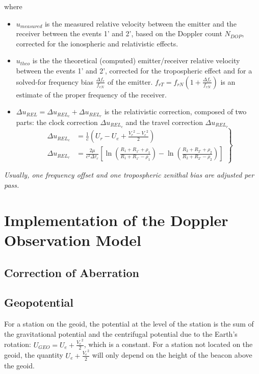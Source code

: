 where 
\begin{itemize}
    \item \(u_{measured}\) is the measured relative velocity between the emitter and 
    the receiver between the events 1' and 2', based on the Doppler count \(N_{DOP}\), 
    corrected for the ionospheric and relativistic effects.

    \item \(u_{theo}\) is the the theoretical (computed) emitter/receiver relative velocity 
    between the events 1' and 2', corrected for the tropospheric effect and for a solved-for 
    frequency bias \(\frac{\Delta f_e}{f_{eN}}\) of the emitter. \(f_{rT} = f_{rN} (1 + \frac{\Delta f_r}{f_{rN}})\) 
    is an estimate of the proper frequency of the receiver.

    \item \(\Delta u_{REL} = \Delta u_{{REL}_c} + \Delta u_{{REL}_r}\) is the relativistic 
    correction, composed of two parts: the clock correction \(\Delta u_{{REL}_c}\) and the 
    travel correction \(\Delta u_{{REL}_r}\)
    \begin{equation}
        \left.\begin{aligned}
            \Delta u_{{REL}_c} & = \frac{1}{c} (U_r - U_e + \frac{{V_r}^2 - {V_e}^2}{2})\\
            \Delta u_{{REL}_r} & = \frac{2 \mu}{c^2 \Delta\tau_r} [\ln{(\frac{R_1 + R_{1'} + \rho_1}{R_1 + R_{1'} - \rho_1})} - \ln{(\frac{R_2 + R_{2'} + \rho_2}{R_2 + R_{2'} - \rho_2})}]
        \end{aligned}
    \right\}
    \end{equation}
\end{itemize}

\emph{Usually, one frequency offset and one tropospheric zenithal bias are adjusted per pass.}

\section{Implementation of the Doppler Observation Model}

\subsection{Correction of Aberration}

\subsection{Geopotential}
For a station on the geoid, the potential at the level of the station is the sum 
of the gravitational potential and the centrifugal potential due to the Earth's 
rotation: \(U_{GEO} = U_e + \frac{{V_e}^2}{2}\), which is a constant. For a station 
not located on the geoid, the quantity \(U_e + \frac{{V_e}^2}{2}\) will only depend 
on the height of the beacon above the geoid.

